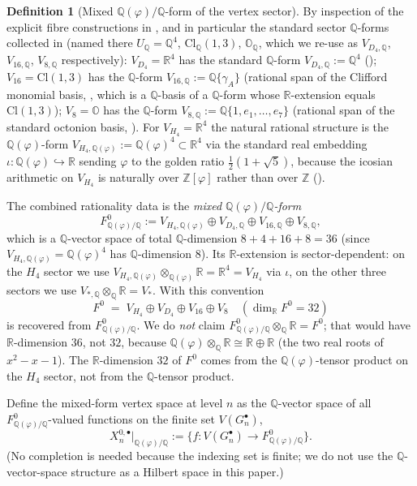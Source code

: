 \documentclass[11pt, a4paper]{amsart}
\theoremstyle{definition}
\newtheorem{definition}[theorem]{Definition}
\newcommand{\R}{\mathbb{R}}
\newcommand{\Q}{\mathbb{Q}}
\newcommand{\Z}{\mathbb{Z}}
\newcommand{\OO}{\mathbb{O}}
\newcommand{\Cl}{\mathrm{Cl}}
\begin{document}
\begin{definition}[Mixed $\Q(\varphi)/\Q$-form of the vertex sector]
\label{def:Xn-Q-form}
By inspection of the explicit fibre constructions in
\cite{AlgebraicSubstrate}, and in particular the standard
sector $\Q$-forms collected in
\cite[Definition~\texttt{def:Q-forms}]{AlgebraicSubstrate}
(named there $U_\Q = \Q^4$, $\Cl_\Q(1,3)$, $\OO_\Q$, which we
re-use as $V_{D_4, \Q}$, $V_{16, \Q}$, $V_{8, \Q}$
respectively):
$V_{D_4} = \R^4$ has
the standard $\Q$-form $V_{D_4, \Q} := \Q^4$
(\cite[Definition~\texttt{def:V24} and
Proposition~\texttt{prop:24-in-600}]{AlgebraicSubstrate});
$V_{16} = \Cl(1, 3)$ has the $\Q$-form
$V_{16, \Q} := \Q\{\gamma_A\}$
(rational span of the Clifford monomial basis,
\cite[Definition~\texttt{def:Cl-basis}]{AlgebraicSubstrate}, which is a $\Q$-basis of a
$\Q$-form whose $\R$-extension equals $\Cl(1, 3)$); $V_{8} = \OO$
has the $\Q$-form $V_{8, \Q} := \Q\{1, e_1, \ldots, e_7\}$
(rational span of the standard octonion basis,
\cite[Definition~\texttt{def:octonions}]{AlgebraicSubstrate}). For $V_{H_4} = \R^4$ the
natural rational structure is the $\Q(\varphi)$-form
$V_{H_4, \Q(\varphi)} := \Q(\varphi)^4 \subset \R^4$ via the
standard real embedding $\iota \colon \Q(\varphi) \hookrightarrow \R$
sending $\varphi$ to the golden ratio
$\tfrac12(1 + \sqrt{5})$, because the icosian arithmetic on
$V_{H_4}$ is naturally over $\Z[\varphi]$ rather than over $\Z$
(\cite[Definition~\texttt{def:icosian-ring} and
Theorem~\texttt{thm:icosian-closure}]{AlgebraicSubstrate}).

The combined rationality data is the \emph{mixed
$\Q(\varphi)/\Q$-form}
\[
  F^0_{\Q(\varphi)/\Q} := V_{H_4, \Q(\varphi)} \oplus V_{D_4, \Q}
    \oplus V_{16, \Q} \oplus V_{8, \Q},
\]
which is a $\Q$-vector space of total $\Q$-dimension
$8 + 4 + 16 + 8 = 36$ (since $V_{H_4, \Q(\varphi)} = \Q(\varphi)^4$
has $\Q$-dimension $8$). Its $\R$-extension is sector-dependent: on the
$H_4$ sector we use $V_{H_4, \Q(\varphi)} \otimes_{\Q(\varphi)} \R
= \R^4 = V_{H_4}$ via $\iota$, on the other three sectors we use
$V_{*, \Q} \otimes_\Q \R = V_*$. With this convention
\[
  F^0 \;=\; V_{H_4} \oplus V_{D_4} \oplus V_{16} \oplus V_{8}
  \quad (\dim_\R F^0 = 32)
\]
is recovered from $F^0_{\Q(\varphi)/\Q}$. We do \emph{not} claim
$F^0_{\Q(\varphi)/\Q} \otimes_\Q \R = F^0$; that would have
$\R$-dimension $36$, not $32$, because $\Q(\varphi) \otimes_\Q \R
\cong \R \oplus \R$ (the two real roots of $x^2 - x - 1$). The
$\R$-dimension $32$ of $F^0$ comes from the $\Q(\varphi)$-tensor
product on the $H_4$ sector, not from the $\Q$-tensor product.

Define the mixed-form vertex space at level $n$ as the
$\Q$-vector space of all $F^0_{\Q(\varphi)/\Q}$-valued functions
on the finite set $V(G_n^\bullet)$,
\[
  X_n^{0, \bullet}|_{\Q(\varphi)/\Q}
  := \bigl\{ f \colon V(G_n^\bullet) \to F^0_{\Q(\varphi)/\Q} \bigr\}.
\]
(No completion is needed because the indexing set is finite; we
do not use the $\Q$-vector-space structure as a Hilbert space in
this paper.)
\end{definition}
\end{document}
